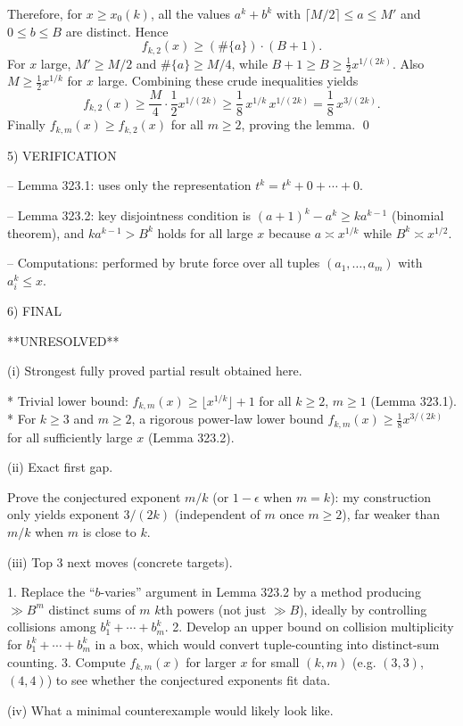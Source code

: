 Therefore, for $x\ge x_0(k)$, all the values $a^k+b^k$ with $\lceil M/2\rceil\le a\le M'$ and $0\le b\le B$ are distinct.
Hence
\[
f_{k,2}(x)\ge (\#\{a\})\cdot (B+1).
\]
For $x$ large, $M'\ge M/2$ and $\#\{a\}\ge M/4$, while $B+1\ge B\ge \tfrac12 x^{1/(2k)}$.
Also $M\ge \tfrac12 x^{1/k}$ for $x$ large. Combining these crude inequalities yields
\[
f_{k,2}(x)\ge \frac{M}{4}\cdot \frac12 x^{1/(2k)}\ge \frac{1}{8}\,x^{1/k}\,x^{1/(2k)}=\frac{1}{8}\,x^{3/(2k)}.
\]
Finally $f_{k,m}(x)\ge f_{k,2}(x)$ for all $m\ge 2$, proving the lemma. \qed


5) VERIFICATION

-- Lemma 323.1: uses only the representation $t^k=t^k+0+\cdots+0$.

-- Lemma 323.2: key disjointness condition is $(a+1)^k-a^k\ge k a^{k-1}$ (binomial theorem), and $k a^{k-1}>B^k$ holds for all large $x$ because $a\asymp x^{1/k}$ while $B^k\asymp x^{1/2}$.

-- Computations: performed by brute force over all tuples $(a_1,\dots,a_m)$ with $a_i^k\le x$.


6) FINAL

**UNRESOLVED**

(i) Strongest fully proved partial result obtained here.

* Trivial lower bound: $f_{k,m}(x)\ge \lfloor x^{1/k}\rfloor+1$ for all $k\ge 2$, $m\ge 1$ (Lemma 323.1).
* For $k\ge 3$ and $m\ge 2$, a rigorous power-law lower bound $f_{k,m}(x)\ge \tfrac18 x^{3/(2k)}$ for all sufficiently large $x$ (Lemma 323.2).

(ii) Exact first gap.

Prove the conjectured exponent $m/k$ (or $1-\epsilon$ when $m=k$): my construction only yields exponent $3/(2k)$ (independent of $m$ once $m\ge 2$), far weaker than $m/k$ when $m$ is close to $k$.

(iii) Top 3 next moves (concrete targets).

1. Replace the ``$b$-varies'' argument in Lemma 323.2 by a method producing $\gg B^{m}$ distinct sums of $m$ $k$th powers (not just $\gg B$), ideally by controlling collisions among $b_1^k+\cdots+b_m^k$.
2. Develop an upper bound on collision multiplicity for $b_1^k+\cdots+b_m^k$ in a box, which would convert tuple-counting into distinct-sum counting.
3. Compute $f_{k,m}(x)$ for larger $x$ for small $(k,m)$ (e.g. $(3,3)$, $(4,4)$) to see whether the conjectured exponents fit data.

(iv) What a minimal counterexample would likely look like.

